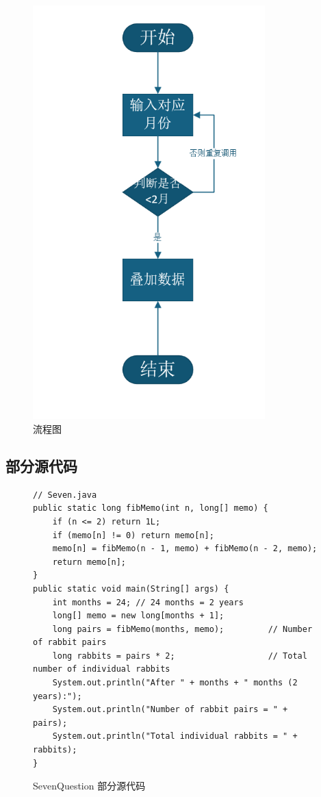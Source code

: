 \documentclass[12pt,a4paper]{article}
\begin{document}
\begin{figure}[H]
\centering
\includegraphics[width=0.8\textwidth]{seven1.png}
\caption{流程图}
\end{figure}

\subsection*{部分源代码}
\begin{figure}[H]
\centering
\begin{lstlisting}
// Seven.java
public static long fibMemo(int n, long[] memo) {
    if (n <= 2) return 1L;
    if (memo[n] != 0) return memo[n];
    memo[n] = fibMemo(n - 1, memo) + fibMemo(n - 2, memo);
    return memo[n];
}
public static void main(String[] args) {
    int months = 24; // 24 months = 2 years
    long[] memo = new long[months + 1];
    long pairs = fibMemo(months, memo);         // Number of rabbit pairs
    long rabbits = pairs * 2;                   // Total number of individual rabbits
    System.out.println("After " + months + " months (2 years):");
    System.out.println("Number of rabbit pairs = " + pairs);
    System.out.println("Total individual rabbits = " + rabbits);
}

\end{lstlisting}

\caption{SevenQuestion 部分源代码}
\end{figure}
\end{document}
